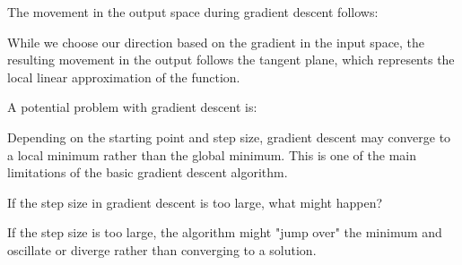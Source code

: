 \documentclass{ximera}
\begin{document}
\begin{exercise}
The movement in the output space during gradient descent follows:

\begin{multipleChoice}
\end{multipleChoice}

\begin{feedback}
While we choose our direction based on the gradient in the input space, the resulting movement in the output follows the tangent plane, which represents the local linear approximation of the function.
\end{feedback}
\end{exercise}

\begin{exercise}
A potential problem with gradient descent is:

\begin{multipleChoice}
\end{multipleChoice}

\begin{feedback}
Depending on the starting point and step size, gradient descent may converge to a local minimum rather than the global minimum. This is one of the main limitations of the basic gradient descent algorithm.
\end{feedback}
\end{exercise}

\begin{exercise}
If the step size in gradient descent is too large, what might happen?

\begin{multipleChoice}
\end{multipleChoice}

\begin{feedback}
If the step size is too large, the algorithm might "jump over" the minimum and oscillate or diverge rather than converging to a solution.
\end{feedback}
\end{exercise}
\end{document}
